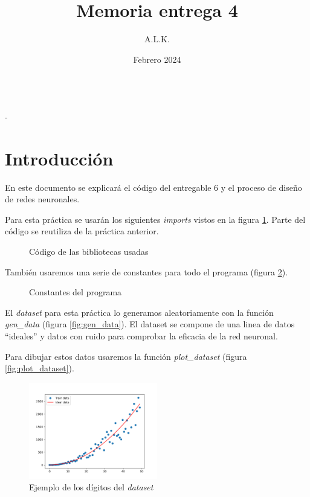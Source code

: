 \documentclass[6pt]{../../shared/AiTex}
\title{Memoria entrega 4}
\author{A.L.K.}
\date{Febrero 2024}
\begin{document}
\justify

\begin{center}

    {\huge \textbf{\underline{\subtitulo}}} \\
    { \lesson - \autor}

\end{center}


\section*{Introducción}

En este documento se explicará el código del entregable 6 y el proceso de diseño de redes neuronales.

Para esta práctica se usarán los siguientes \textit{imports} vistos en la figura \ref{fig:imports}. Parte del código se reutiliza de la práctica anterior.
\begin{figure}[H]
    \centering
    
    \caption{Código de las bibliotecas usadas}
    \label{fig:imports}
\end{figure}

También usaremos una serie de constantes para todo el programa (figura \ref{fig:constants}).

\begin{figure}[H]
    \centering
    
    \caption{Constantes del programa}
    \label{fig:constants}
\end{figure}

El \textit{dataset} para esta práctica lo generamos aleatoriamente con la función \textit{gen\_data} (figura \ref{fig:gen_data}). El dataset se compone de una linea de datos ``ideales'' y datos con ruido para comprobar la eficacia de la red neuronal.

Para dibujar estos datos usaremos la función \textit{plot\_dataset} (figura \ref{fig:plot_dataset}).

\begin{figure}[H]
    \centering
    \includegraphics[width=0.5\textwidth]{./images/dataset.png}
    \caption{Ejemplo de los dígitos del \textit{dataset}}
    \label{fig:digitos}
\end{figure}
\end{document}
